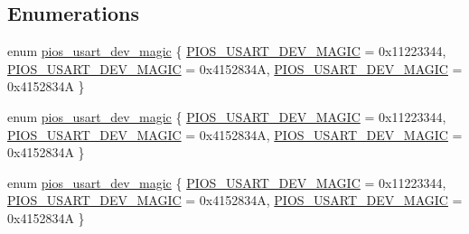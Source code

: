 \subsection*{Enumerations}
\begin{DoxyCompactItemize}
\item 
enum \hyperlink{group___p_i_o_s___u_s_a_r_t_gabc5ff4f4da76683608f4140d4e343a32}{pios\-\_\-usart\-\_\-dev\-\_\-magic} \{ \hyperlink{group___p_i_o_s___u_s_a_r_t_ggabc5ff4f4da76683608f4140d4e343a32a58fce3273a001baada6ae6f67f4ce3f7}{P\-I\-O\-S\-\_\-\-U\-S\-A\-R\-T\-\_\-\-D\-E\-V\-\_\-\-M\-A\-G\-I\-C} = 0x11223344, 
\hyperlink{group___p_i_o_s___u_s_a_r_t_ggabc5ff4f4da76683608f4140d4e343a32a58fce3273a001baada6ae6f67f4ce3f7}{P\-I\-O\-S\-\_\-\-U\-S\-A\-R\-T\-\_\-\-D\-E\-V\-\_\-\-M\-A\-G\-I\-C} = 0x4152834\-A, 
\hyperlink{group___p_i_o_s___u_s_a_r_t_ggabc5ff4f4da76683608f4140d4e343a32a58fce3273a001baada6ae6f67f4ce3f7}{P\-I\-O\-S\-\_\-\-U\-S\-A\-R\-T\-\_\-\-D\-E\-V\-\_\-\-M\-A\-G\-I\-C} = 0x4152834\-A
 \}
\item 
enum \hyperlink{group___p_i_o_s___u_s_a_r_t_gabc5ff4f4da76683608f4140d4e343a32}{pios\-\_\-usart\-\_\-dev\-\_\-magic} \{ \hyperlink{group___p_i_o_s___u_s_a_r_t_ggabc5ff4f4da76683608f4140d4e343a32a58fce3273a001baada6ae6f67f4ce3f7}{P\-I\-O\-S\-\_\-\-U\-S\-A\-R\-T\-\_\-\-D\-E\-V\-\_\-\-M\-A\-G\-I\-C} = 0x11223344, 
\hyperlink{group___p_i_o_s___u_s_a_r_t_ggabc5ff4f4da76683608f4140d4e343a32a58fce3273a001baada6ae6f67f4ce3f7}{P\-I\-O\-S\-\_\-\-U\-S\-A\-R\-T\-\_\-\-D\-E\-V\-\_\-\-M\-A\-G\-I\-C} = 0x4152834\-A, 
\hyperlink{group___p_i_o_s___u_s_a_r_t_ggabc5ff4f4da76683608f4140d4e343a32a58fce3273a001baada6ae6f67f4ce3f7}{P\-I\-O\-S\-\_\-\-U\-S\-A\-R\-T\-\_\-\-D\-E\-V\-\_\-\-M\-A\-G\-I\-C} = 0x4152834\-A
 \}
\item 
enum \hyperlink{group___p_i_o_s___u_s_a_r_t_gabc5ff4f4da76683608f4140d4e343a32}{pios\-\_\-usart\-\_\-dev\-\_\-magic} \{ \hyperlink{group___p_i_o_s___u_s_a_r_t_ggabc5ff4f4da76683608f4140d4e343a32a58fce3273a001baada6ae6f67f4ce3f7}{P\-I\-O\-S\-\_\-\-U\-S\-A\-R\-T\-\_\-\-D\-E\-V\-\_\-\-M\-A\-G\-I\-C} = 0x11223344, 
\hyperlink{group___p_i_o_s___u_s_a_r_t_ggabc5ff4f4da76683608f4140d4e343a32a58fce3273a001baada6ae6f67f4ce3f7}{P\-I\-O\-S\-\_\-\-U\-S\-A\-R\-T\-\_\-\-D\-E\-V\-\_\-\-M\-A\-G\-I\-C} = 0x4152834\-A, 
\hyperlink{group___p_i_o_s___u_s_a_r_t_ggabc5ff4f4da76683608f4140d4e343a32a58fce3273a001baada6ae6f67f4ce3f7}{P\-I\-O\-S\-\_\-\-U\-S\-A\-R\-T\-\_\-\-D\-E\-V\-\_\-\-M\-A\-G\-I\-C} = 0x4152834\-A
 \}
\end{DoxyCompactItemize}
